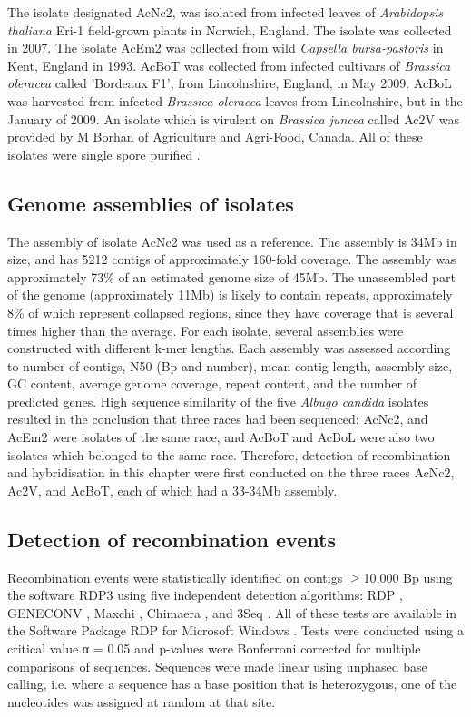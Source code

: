 The isolate designated AcNc2, was isolated from infected leaves of \textit{Arabidopsis thaliana} Eri-1 field-grown plants in Norwich, England. The isolate was collected in 2007. The isolate AcEm2 was collected from wild \textit{Capsella bursa-pastoris} in Kent, England in 1993. AcBoT was collected from infected cultivars of \textit{Brassica oleracea} called 'Bordeaux F1', from Lincolnshire, England, in May 2009. AcBoL was harvested from infected \textit{Brassica oleracea} leaves from Lincolnshire, but in the January of 2009. An isolate which is virulent on \textit{Brassica juncea} called Ac2V was provided by M Borhan of Agriculture and Agri-Food, Canada. All of these isolates were single spore purified \parencite{Kemen2011}.

\subsection{Genome assemblies of isolates}
The assembly of isolate AcNc2 was used as a reference. The assembly is 34Mb in size, and has 5212 contigs of approximately 160-fold coverage. The assembly was approximately 73\% of an estimated genome size of 45Mb. The unassembled part of the genome (approximately 11Mb) is likely to contain repeats, approximately 8\% of which represent collapsed regions, since they have coverage that is several times higher than the average. For each isolate, several assemblies were constructed with different k-mer lengths. Each assembly was assessed according to number of contigs, N50 (Bp and number), mean contig length, assembly size, GC content, average genome coverage, repeat content, and the number of predicted genes. High sequence similarity of the five \textit{Albugo candida} isolates resulted in the conclusion that three races had been sequenced: AcNc2, and AcEm2 were isolates of the same race, and AcBoT and AcBoL were also two isolates which belonged to the same race. Therefore, detection of recombination and hybridisation in this chapter were first conducted on the three races AcNc2, Ac2V, and AcBoT, each of which had a 33-34Mb assembly.

\subsection{Detection of recombination events}
Recombination events were statistically identified on contigs $\geq$10,000 Bp using the software RDP3 using five independent detection algorithms: RDP \parencite{Martin2000RDP:Sequences.}, GENECONV \parencite{Padidam1999PossibleRecombination.}, Maxchi \parencite{Smith1992a}, Chimaera \parencite{Posada2001b}, and 3Seq \parencite{Boni2007AnTriplets}. All of these tests are available in the Software Package RDP for Microsoft Windows \parencite{Martin2015RDP4:Genomes}. Tests were conducted using a critical value α = 0.05 and p-values were Bonferroni corrected for multiple comparisons of sequences. Sequences were made linear using unphased base calling, i.e. where a sequence has a base position that is heterozygous, one of the nucleotides was assigned at random at that site. 

